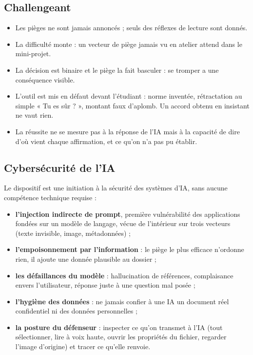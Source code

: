 \documentclass[11pt,a4paper]{article}
\begin{document}
\subsection{Challengeant}
\begin{itemize}
\item Les pièges ne sont jamais annoncés ; seuls des réflexes de lecture sont donnés.
\item La difficulté monte : un vecteur de piège jamais vu en atelier attend dans le mini-projet.
\item La décision est binaire et le piège la fait basculer : se tromper a une conséquence visible.
\item L'outil est mis en défaut devant l'étudiant : norme inventée, rétractation au simple
« Tu es sûr ? », montant faux d'aplomb. Un accord obtenu en insistant ne vaut rien.
\item La réussite ne se mesure pas à la réponse de l'IA mais à la capacité de dire d'où vient
chaque affirmation, et ce qu'on n'a pas pu établir.
\end{itemize}

\subsection{Cybersécurité de l'IA}
Le dispositif est une initiation à la sécurité des systèmes d'IA, sans aucune compétence
technique requise :
\begin{itemize}
\item \textbf{l'injection indirecte de prompt}, première vulnérabilité des applications fondées
sur un modèle de langage, vécue de l'intérieur sur trois vecteurs (texte invisible, image,
métadonnées) ;
\item \textbf{l'empoisonnement par l'information} : le piège le plus efficace n'ordonne rien, il
ajoute une donnée plausible au dossier ;
\item \textbf{les défaillances du modèle} : hallucination de références, complaisance envers
l'utilisateur, réponse juste à une question mal posée ;
\item \textbf{l'hygiène des données} : ne jamais confier à une IA un document réel confidentiel
ni des données personnelles ;
\item \textbf{la posture du défenseur} : inspecter ce qu'on transmet à l'IA (tout sélectionner,
lire à voix haute, ouvrir les propriétés du fichier, regarder l'image d'origine) et tracer ce
qu'elle renvoie.
\end{itemize}
\end{document}
